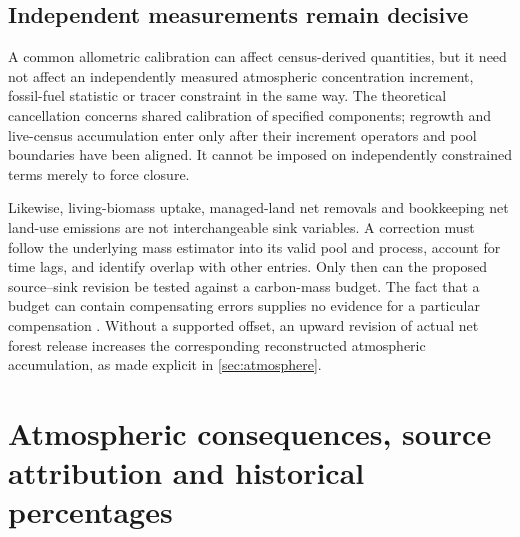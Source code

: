 \documentclass[11pt,a4paper]{article}
\theoremstyle{remark}
\begin{document}
\subsection{Independent measurements remain decisive}
A common allometric calibration can affect census-derived quantities, but it need not affect an independently measured atmospheric concentration increment, fossil-fuel statistic or tracer constraint in the same way. The theoretical cancellation concerns shared calibration of specified components; regrowth and live-census accumulation enter only after their increment operators and pool boundaries have been aligned. It cannot be imposed on independently constrained terms merely to force closure.

Likewise, living-biomass uptake, managed-land net removals and bookkeeping net land-use emissions are not interchangeable sink variables. A correction must follow the underlying mass estimator into its valid pool and process, account for time lags, and identify overlap with other entries. Only then can the proposed source--sink revision be tested against a carbon-mass budget. The fact that a budget can contain compensating errors supplies no evidence for a particular compensation \citep{Friedlingstein2026}. Without a supported offset, an upward revision of actual net forest release increases the corresponding reconstructed atmospheric accumulation, as made explicit in \cref{sec:atmosphere}.

\section{Atmospheric consequences, source attribution and historical percentages}
\end{document}
